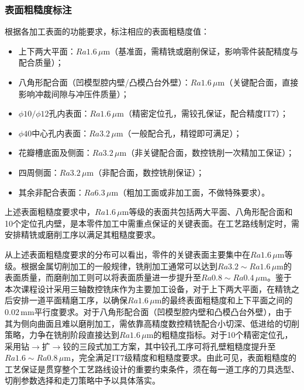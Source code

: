 \documentclass{xautCADreport}
\begin{document}
\subsubsection{表面粗糙度标注}

根据各加工表面的功能要求，标注相应的表面粗糙度值：
\begin{itemize}
  \item 上下两大平面：$Ra1.6\,\mu\mathrm{m}$（基准面，需精铣或磨削保证，影响零件装配精度与配合质量）；
  \item 八角形配合面（凹模型腔内壁/凸模凸台外壁）：$Ra1.6\,\mu\mathrm{m}$（关键配合面，直接影响冲裁间隙与冲压件质量）；
  \item $\phi10/\phi12$孔内表面：$Ra1.6\,\mu\mathrm{m}$（精密定位孔，需铰孔保证，配合精度IT7）；
  \item $\phi40$中心孔内表面：$Ra3.2\,\mu\mathrm{m}$（一般配合孔，精镗即可满足）；
  \item 花瓣槽底面及侧面：$Ra3.2\,\mu\mathrm{m}$（非关键配合面，数控铣削一次精加工保证）；
  \item 四周侧面：$Ra3.2\,\mu\mathrm{m}$（非配合面，数控铣削保证）；
  \item 其余非配合表面：$Ra6.3\,\mu\mathrm{m}$（粗加工面或非加工面，不做特殊要求）。
\end{itemize}

上述表面粗糙度要求中，$Ra1.6\,\mu\mathrm{m}$等级的表面共包括两大平面、八角形配合面和10个定位孔内壁，是本零件加工中需重点保证的关键表面。在工艺路线制定时，需安排精铣或磨削工序以满足其粗糙度要求。

从上述表面粗糙度要求的分布可以看出，零件的关键表面主要集中在$Ra1.6\,\mu\mathrm{m}$等级。根据金属切削加工的一般规律，铣削加工通常可以达到$Ra3.2\sim Ra1.6\,\mu\mathrm{m}$的表面质量，而磨削加工则可以将表面质量进一步提升至$Ra0.8\sim Ra0.4\,\mu\mathrm{m}$。鉴于本次课程设计采用三轴数控铣床作为主要加工设备，对于上下两大平面，在精铣之后安排一道平面精磨工序，以确保$Ra1.6\,\mu\mathrm{m}$的最终表面粗糙度和上下平面之间的$0.02\,\mathrm{mm}$平行度要求。对于八角形配合面（凹模型腔内壁和凸模凸台外壁），由于其为侧向曲面且难以磨削加工，需依靠高精度数控精铣配合小切深、低进给的切削策略，力争在铣削阶段直接达到$Ra1.6\,\mu\mathrm{m}$的粗糙度指标。对于10个精密定位孔，采用钻$\to$扩$\to$铰的三段式加工方案，其中铰孔工序可将孔壁粗糙度提升至$Ra1.6\sim Ra0.8\,\mu\mathrm{m}$，完全满足IT7级精度和粗糙度要求。由此可见，表面粗糙度的工艺保证是贯穿整个工艺路线设计的重要约束条件，须在每一道工序的刀具选型、切削参数选择和走刀策略中予以具体落实。
\end{document}
